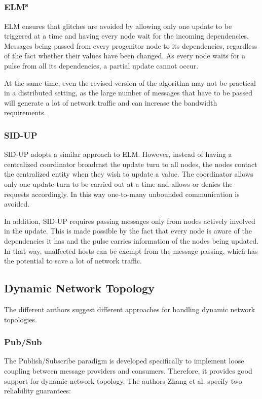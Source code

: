 \documentclass{sigplanconf}
\begin{document}
\subsubsection{ELM\textsuperscript{s}}
ELM \cite{elm} ensures that glitches are avoided by allowing only one update to be triggered at a time and having every node wait for the incoming dependencies. Messages being passed from every progenitor node to its dependencies, regardless of the fact whether their values have been changed. As every node waits for a pulse from all its dependencies, a partial update cannot occur. 

At the same time, even the revised version of the algorithm may not be practical in a distributed setting, as the large number of messages that have to be passed will generate a lot of network traffic and can increase the bandwidth requirements.

\subsubsection{SID-UP}
SID-UP \cite{sidup} adopts a similar approach to ELM. However, instead of having a centralized coordinator broadcast the update turn to all nodes, the nodes contact the centralized entity when they wish to update a value. The coordinator allows only one update turn to be carried out at a time and allows or denies the requests accordingly. In this way one-to-many unbounded communication is avoided. 

In addition, SID-UP requires passing messages only from nodes actively involved in the update. This is made possible by the fact that every node is aware of the dependencies it has and the pulse carries information of the nodes being updated. In that way, unaffected hosts can be exempt from the message passing, which has the potential to save a lot of network traffic.

\subsection{Dynamic Network Topology}

The different authors suggest different approaches for handling dynamic network topologies.

\subsubsection{Pub/Sub}
The Publish/Subscribe paradigm is developed specifically to implement loose coupling between message providers and consumers. Therefore, it provides good support for dynamic network topology. The authors Zhang et al. \cite{totalorder} specify two reliability guarantees:
\end{document}
